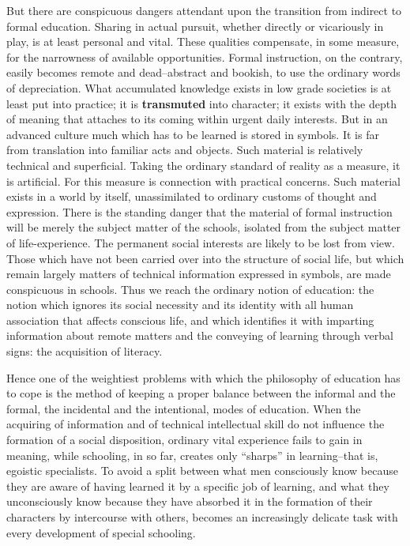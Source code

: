 \begin{linenumbers*}
\indent But there are conspicuous dangers attendant upon the transition from indirect to formal education. Sharing in actual pursuit, whether directly or vicariously in play, is at least personal and vital. These qualities compensate, in some measure, for the narrowness of available opportunities. Formal instruction, on the contrary, easily becomes remote and dead--abstract and bookish, to use the ordinary words of depreciation. What accumulated knowledge exists in low grade societies is at least put into practice; it is \textbf{transmuted} into character; it exists with the depth of meaning that attaches to its coming within urgent daily interests.
But in an advanced culture much which has to be learned is stored in symbols. It is far from translation into familiar acts and objects. Such material is relatively technical and superficial. Taking the ordinary standard of reality as a measure, it is artificial. For this measure is connection with practical concerns. Such material exists in a world by itself, unassimilated to ordinary customs of thought and expression. There is the standing danger that the material of formal instruction will be merely the subject matter of the schools, isolated from the subject matter of life-experience. The permanent social interests are likely to be lost from view. Those which have not been carried over into the structure of social life, but which remain largely matters of technical information expressed in symbols, are made conspicuous in schools. Thus we reach the ordinary notion of education: the notion which ignores its social necessity and its identity with all human association that affects conscious life, and which identifies it with imparting information about remote matters and the conveying of learning through verbal signs: the acquisition of literacy.

\indent Hence one of the weightiest problems with which the philosophy of education has to cope is the method of keeping a proper balance between the informal and the formal, the incidental and the intentional, modes of education. When the acquiring of information and of technical intellectual skill do not influence the formation of a social disposition, ordinary vital experience fails to gain in meaning, while schooling, in so far, creates only ``sharps'' in learning--that is, egoistic specialists. To avoid a split between what men consciously know because they are aware of having learned it by a specific job of learning, and what they unconsciously know because they have absorbed it in the formation of their characters by intercourse with others, becomes an increasingly delicate task with every development of special schooling.
\end{linenumbers*}

